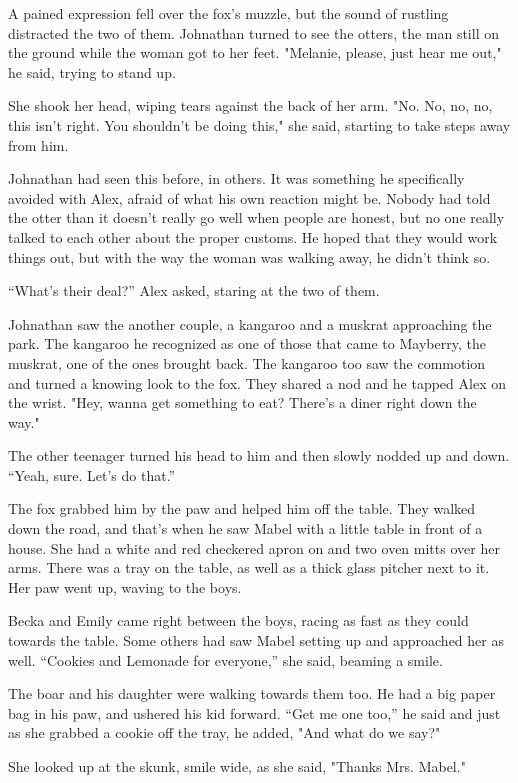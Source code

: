 A pained expression fell over the fox's muzzle, but the sound of
rustling distracted the two of them. Johnathan turned to see the otters,
the man still on the ground while the woman got to her feet. "Melanie,
please, just hear me out," he said, trying to stand up.

She shook her head, wiping tears against the back of her arm. "No. No,
no, no, this isn't right. You shouldn't be doing this," she said,
starting to take steps away from him.

Johnathan had seen this before, in others. It was something he
specifically avoided with Alex, afraid of what his own reaction might
be. Nobody had told the otter than it doesn't really go well when people
are honest, but no one really talked to each other about the proper
customs. He hoped that they would work things out, but with the way the
woman was walking away, he didn't think so.

``What's their deal?'' Alex asked, staring at the two of them.

Johnathan saw the another couple, a kangaroo and a muskrat approaching
the park. The kangaroo he recognized as one of those that came to
Mayberry, the muskrat, one of the ones brought back. The kangaroo too
saw the commotion and turned a knowing look to the fox. They shared a
nod and he tapped Alex on the wrist. "Hey, wanna get something to eat?
There's a diner right down the way."

The other teenager turned his head to him and then slowly nodded up and
down. ``Yeah, sure. Let's do that.''

The fox grabbed him by the paw and helped him off the table. They walked
down the road, and that's when he saw Mabel with a little table in front
of a house. She had a white and red checkered apron on and two oven
mitts over her arms. There was a tray on the table, as well as a thick
glass pitcher next to it. Her paw went up, waving to the boys.

Becka and Emily came right between the boys, racing as fast as they
could towards the table. Some others had saw Mabel setting up and
approached her as well. ``Cookies and Lemonade for everyone,'' she said,
beaming a smile.

The boar and his daughter were walking towards them too. He had a big
paper bag in his paw, and ushered his kid forward. ``Get me one too,'' he
said and just as she grabbed a cookie off the tray, he added, "And what
do we say?"

She looked up at the skunk, smile wide, as she said, "Thanks Mrs.
Mabel."

